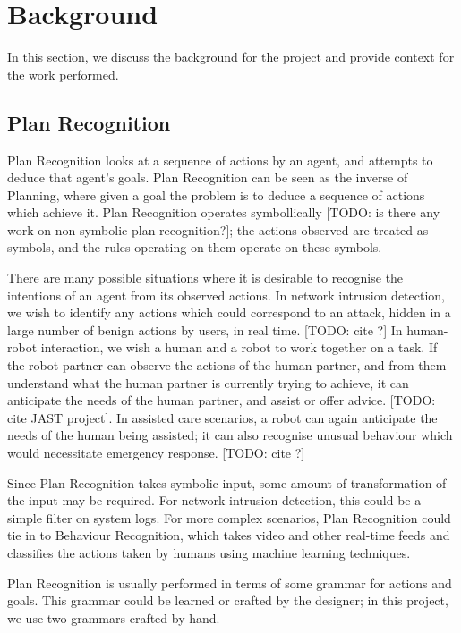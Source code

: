 \chapter{Background}

In this section, we discuss the background for the project and provide context for the work performed.

\section{Plan Recognition}

Plan Recognition looks at a sequence of actions by an agent, and attempts to deduce that agent's goals. Plan Recognition can be seen as the inverse of Planning, where given a goal the problem is to deduce a sequence of actions which achieve it. Plan Recognition operates symbollically [TODO: is there any work on non-symbolic plan recognition?]; the actions observed are treated as symbols, and the rules operating on them operate on these symbols.

There are many possible situations where it is desirable to recognise the intentions of an agent from its observed actions. In network intrusion detection, we wish to identify any actions which could correspond to an attack, hidden in a large number of benign actions by users, in real time. [TODO: cite ?] In human-robot interaction, we wish a human and a robot to work together on a task. If the robot partner can observe the actions of the human partner, and from them understand what the human partner is currently trying to achieve, it can anticipate the needs of the human partner, and assist or offer advice. [TODO: cite JAST project]. In assisted care scenarios, a robot can again anticipate the needs of the human being assisted; it can also recognise unusual behaviour which would necessitate emergency response. [TODO: cite ?]

Since Plan Recognition takes symbolic input, some amount of transformation of the input may be required. For network intrusion detection, this could be a simple filter on system logs. For more complex scenarios, Plan Recognition could tie in to Behaviour Recognition, which takes video and other real-time feeds and classifies the actions taken by humans using machine learning techniques.

Plan Recognition is usually performed in terms of some grammar for actions and goals. This grammar could be learned or crafted by the designer; in this project, we use two grammars crafted by hand.


